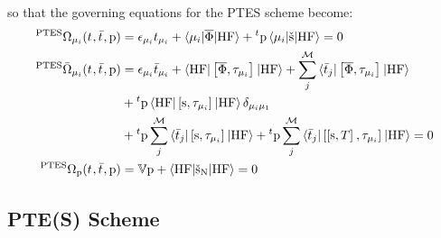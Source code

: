 so that the governing equations for the \acs{PTES} scheme become:
\begin{subequations}
  \begin{align}
   {}^{\mathrm{PTES}}\Omega_{\mu_i}(t_{}, \bar{t}_{}, \mathrm{p})  &=
   \epsilon_{\mu_i}t_{\mu_i} + \braket{\mu_i | \overline{\Phi} | \mathrm{HF}}
   + {}^t\mathrm{p}\braket{\mu_i | \check{\mathrm{s}} | \mathrm{HF}}
             = 0 \label{eq:ptes-cc-amplitudes}\\
   {}^{\mathrm{PTES}}\bar{\Omega}_{\mu_i}(t_{}, \bar{t}_{}, \mathrm{p})
    &=
    \epsilon_{\mu_i}\bar{t}_{\mu_i} +
    \braket{\mathrm{HF} | \left[ \overline{\Phi}, \tau_{\mu_i} \right]^{} | \mathrm{HF}} +
    \sum_{j}^{\mathcal{M}}\braket{\bar{t}_{j} |
    \left[ \overline{\Phi}, \tau_{\mu_i} \right]^{} | \mathrm{HF}}
    \nonumber \\
    &+
    {}^t\mathrm{p}\braket{\mathrm{HF} | \left[ \mathrm{s}, \tau_{\mu_i} \right]^{} | \mathrm{HF}}\delta_{\mu_i\mu_1} \nonumber \\
    &+
    {}^t\mathrm{p}\sum_{j}^{\mathcal{M}}\braket{\bar{t}_{j} | \left[ \mathrm{s}, \tau_{\mu_i} \right]^{} | \mathrm{HF}}
    +
    {}^t\mathrm{p}\sum_{j}^{\mathcal{M}}\braket{\bar{t}_{j} | \left[ \left[ \mathrm{s}, T \right]^{}, \tau_{\mu_i} \right]^{} | \mathrm{HF}}
             = 0 \label{eq:ptes-cc-multipliers}\\
    {}^{\mathrm{PTES}}\Omega_{\mathrm{p}}(t_{}, \bar{t}_{}, \mathrm{p})
    &=
    \mathbb{V}\mathrm{p} + \braket{\mathrm{HF} | \check{\mathrm{s}}_{\mathrm{N}} | \mathrm{HF}} = 0
    \label{eq:ptes-cc-polarization}
  \end{align}
\end{subequations}


\subsection*{PTE(S) Scheme}


